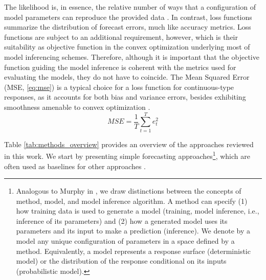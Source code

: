 The likelihood is, in essence, the relative number of ways that a configuration of model parameters can reproduce the provided data \cite{mcelreath2020rethinking}. In contrast, loss functions summarize the distribution of forecast errors, much like accuracy metrics. Loss functions are subject to an additional requirement, however, which is their suitability  as objective function in the convex optimization underlying most of model inferencing schemes. Therefore, although it is important that the objective function guiding the model inference is coherent with the metrics used for evaluating the models, they do not have to coincide. The Mean Squared Error (MSE, \ref{eq:mse}) is a typical choice for a loss function for continuous-type responses, as it accounts for both bias and variance errors, besides exhibiting smoothness amenable to convex optimization \cite{goodfellow2016deep}.
\begin{equation}\label{eq:mse}
    MSE = \frac{1}{T}\sum_{t=1}^T e^2_t
\end{equation}

Table \ref{tab:methods_overview} provides an overview of the approaches reviewed in this work. We start by presenting simple forecasting approaches\footnote[1]{Analogous to Murphy in \cite{murphy2012probabilistic}, we draw distinctions between the concepts of method, model, and model inference algorithm. A method can specify (1) how training data is used to generate a model (training, model inference, i.e., inference of its parameters) and (2) how a generated model uses its parameters and its input to make a prediction (inference). We denote by a model any unique configuration of parameters in a space defined by a method. Equivalently, a model represents a response surface (deterministic model) or the distribution of the response conditional on its inputs (probabilistic model).}, which are often used as baselines for other approaches \cite{hyndman2018principles}.



